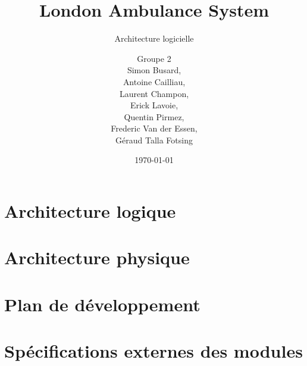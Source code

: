 \documentclass{report}
\title{London Ambulance System}
\subtitle{Architecture logicielle}
\author{\normalsize{Groupe 2}\\
\footnotesize{
Simon Busard, \\
Antoine Cailliau, \\
Laurent Champon,\\
Erick Lavoie, \\
Quentin Pirmez,\\
Frederic Van der Essen, \\
Géraud Talla Fotsing}}
\date{\today}
\begin{document}
\setlength{\parskip}{1em}
\startdocument

\maketitle
\setcounter{tocdepth}{1}
\tableofcontents

\chapter{Architecture logique}

\chapter{Architecture physique}

\chapter{Plan de développement}

\chapter{Spécifications externes des modules}
\end{document}
